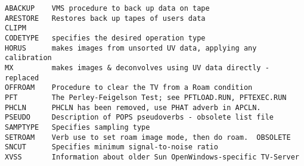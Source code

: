 \vskip 0.5pt
\bbve\begin{verbatim}
ABACKUP    VMS procedure to back up data on tape
ARESTORE   Restores back up tapes of users data
CLIPM
CODETYPE   specifies the desired operation type
HORUS      makes images from unsorted UV data, applying any calibration
MX         makes images & deconvolves using UV data directly - replaced
OFFROAM    Procedure to clear the TV from a Roam condition
PFT        The Perley-Feigelson Test; see PFTLOAD.RUN, PFTEXEC.RUN
PHCLN      PHCLN has been removed, use PHAT adverb in APCLN.
PSEUDO     Description of POPS pseudoverbs - obsolete list file
SAMPTYPE   Specifies sampling type
SETROAM    Verb use to set roam image mode, then do roam.  OBSOLETE
SNCUT      Specifies minimum signal-to-noise ratio
XVSS       Information about older Sun OpenWindows-specific TV-Server
\end{verbatim}\eve


